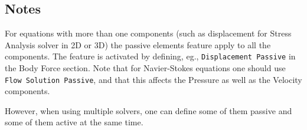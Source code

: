 \subsection*{Notes}

For equations with more than one components (such as displacement for
Stress Analysis solver in 2D or 3D) the passive elements feature apply
to all the components. The feature is activated by defining, eg.,
\texttt{Displacement Passive} in the Body Force section. Note that
for Navier-Stokes equations one should use \texttt{Flow Solution
  Passive}, and that this affects the Pressure as well as the Velocity
components. 

However, when using multiple solvers, one can define some of them
passive and some of them active at the same time.


\hfill